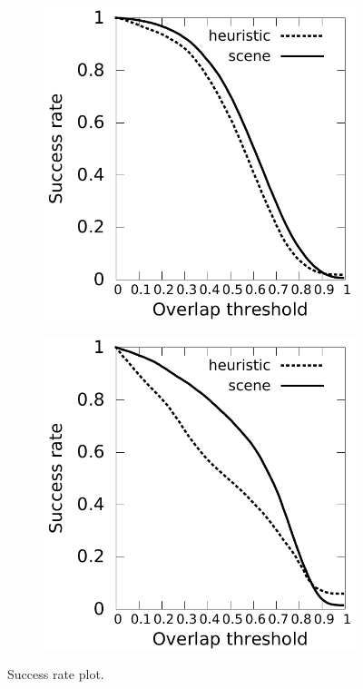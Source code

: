 \begin{figure}
    \centering
     \centering
     \begin{subfigure}{0.48\linewidth}
    \includegraphics[width=\linewidth]{./img/semantic_tracker/exp/success_lowRes.pdf}
    \end{subfigure}
    \begin{subfigure}{0.48\linewidth}
    \includegraphics[width=\linewidth]{./img/semantic_tracker/exp/success_highRes.pdf}
    \end{subfigure}
    \caption{Success rate plot.}
    \label{fig:semantic-eval-success}
\end{figure}